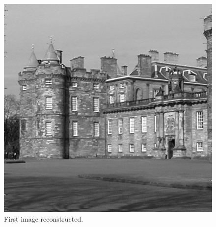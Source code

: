 \documentclass[a4paper,12pt]{article}
\begin{document}
\begin{figure}[h]
\begin{minipage}{.5\textwidth}
  \includegraphics[width=0.95\linewidth]{img/sync1}
  \caption{First image reconstructed.}
  \label{fig.7}
\end{minipage}
\end{figure}
\end{document}
